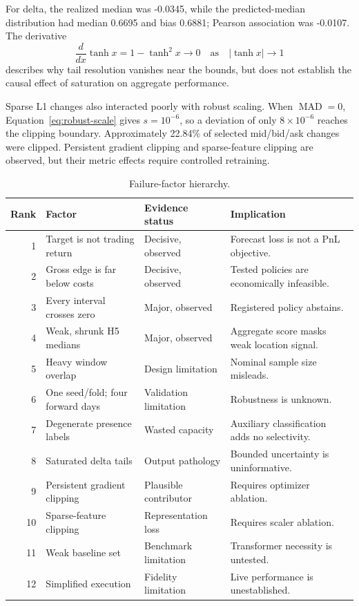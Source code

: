 \documentclass[10pt,letterpaper]{article}
\numberwithin{equation}{section}
\theoremstyle{definition}
\theoremstyle{remark}
\begin{document}
For delta, the realized median was -0.0345, while the predicted-median
distribution had median 0.6695 and bias 0.6881; Pearson association was
-0.0107. The derivative
\begin{equation}
\frac{d}{dx}\tanh x=1-\tanh^2x\longrightarrow0
\quad\text{as}\quad|\tanh x|\longrightarrow1
\label{eq:tanh-saturation}
\end{equation}
describes why tail resolution vanishes near the bounds, but does not establish
the causal effect of saturation on aggregate performance.

Sparse L1 changes also interacted poorly with robust scaling. When
\(\operatorname{MAD}=0\), Equation~\eqref{eq:robust-scale} gives
\(s=10^{-6}\), so a deviation of only \(8\times10^{-6}\) reaches the clipping
boundary. Approximately 22.84\% of selected mid/bid/ask changes were clipped.
Persistent gradient clipping and sparse-feature clipping are observed, but
their metric effects require controlled retraining.

\begin{table}[!htbp]
\centering
\scriptsize
\begin{tabularx}{\textwidth}{@{}rY p{2.8cm}Y@{}}
\toprule
\textbf{Rank} & \textbf{Factor} & \textbf{Evidence status} &
\textbf{Implication}\\
 & Target is not trading return & Decisive, observed & Forecast loss is not a
PnL objective.\\
2 & Gross edge is far below costs & Decisive, observed & Tested policies are
economically infeasible.\\
3 & Every interval crosses zero & Major, observed & Registered policy abstains.\\
4 & Weak, shrunk H5 medians & Major, observed & Aggregate score masks weak
location signal.\\
5 & Heavy window overlap & Design limitation & Nominal sample size misleads.\\
6 & One seed/fold; four forward days & Validation limitation & Robustness is
unknown.\\
7 & Degenerate presence labels & Wasted capacity & Auxiliary classification
adds no selectivity.\\
8 & Saturated delta tails & Output pathology & Bounded uncertainty is
uninformative.\\
9 & Persistent gradient clipping & Plausible contributor & Requires optimizer
ablation.\\
10 & Sparse-feature clipping & Representation loss & Requires scaler ablation.\\
11 & Weak baseline set & Benchmark limitation & Transformer necessity is
untested.\\
12 & Simplified execution & Fidelity limitation & Live performance is
unestablished.\\
\bottomrule
\end{tabularx}
\caption{Failure-factor hierarchy.}
\label{tab:failure-factors}
\end{table}
\end{document}
